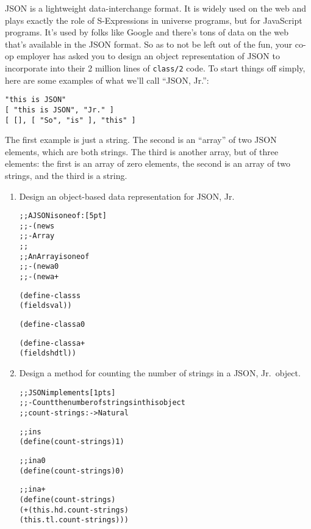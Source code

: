 \documentclass[12pt]{article}                   %
\def\pts#1{\marginpar{\footnotesize \raggedright  \fbox{#1 {\sc Points}}}}
\begin{document}
\vfill\thispagestyle{empty}
\newpage

\begin{problem} \pts{20}

JSON is a lightweight data-interchange format.  It is widely used on
the web and plays exactly the role of S-Expressions in universe
programs, but for JavaScript programs.  It's used by folks like Google
and there's tons of data on the web that's available in the JSON
format.  So as to not be left out of the fun, your co-op employer has
asked you to design an object representation of JSON to incorporate
into their 2 million lines of {\tt class/2} code.  To start things off
simply, here are some examples of what we'll call ``JSON, Jr.'':

\begin{verbatim}
"this is JSON"
[ "this is JSON", "Jr." ]
[ [], [ "So", "is" ], "this" ]
\end{verbatim}
The first example is just a string.  The second is an ``array'' of two
JSON elements, which are both strings.  The third is another array,
but of three elements: the first is an array of zero elements, the
second is an array of two strings, and the third is a string.

\begin{enumerate}
\item Design an object-based data representation for JSON, Jr.

\ifrubric
\begin{alltt}
;; A JSON is one of:  [5pt]
;; - (new s% String)
;; - Array
;;
;; An Array is one of
;; - (new a0%)
;; - (new a+% JSON Array)

(define-class s%
  (fields val))

(define-class a0%)

(define-class a+%
  (fields hd tl))
\end{alltt}
\else
{}
\fi
\newpage

\item Design a method for counting the number of strings in a JSON,
  Jr.~object.
\ifrubric
\begin{alltt}
;; JSON implements [1pts]
;; - Count the number of strings in this object
;;   count-strings : -> Natural

;; in s% [1pt]
(define (count-strings) 1)

;; in a0% [1pt]
(define (count-strings) 0)

;; in a+% [1pt]
(define (count-strings)
  (+ (this . hd . count-strings)
     (this . tl . count-strings)))


\end{alltt}
\end{enumerate}
\end{problem}
\end{document}
